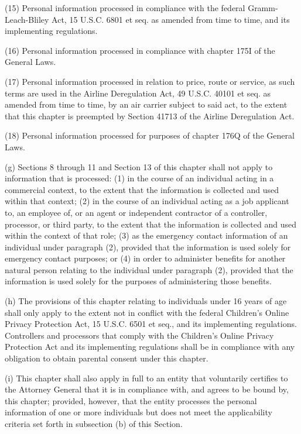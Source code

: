 (15) Personal information processed in compliance with the federal Gramm-Leach-Bliley Act, 15 U.S.C. 6801 et seq. as amended from time to time, and its implementing regulations. 

(16) Personal information processed in compliance with chapter 175I of the General Laws.  

(17) Personal information processed in relation to price, route or service, as such terms are used in the Airline Deregulation Act, 49 U.S.C. 40101 et seq. as amended from time to time, by an air carrier subject to said act, to the extent that this chapter is preempted by Section 41713 of the Airline Deregulation Act.

(18) Personal information processed for purposes of chapter 176Q of the General Laws.

(g) Sections 8 through 11 and Section 13 of this chapter shall not apply to information that is processed: (1) in the course of an individual acting in a commercial context, to the extent that the information is collected and used within that context; (2) in the course of an individual acting as a job applicant to, an employee of, or an agent or independent contractor of a controller, processor, or third party, to the extent that the information is collected and used within the context of that role; (3) as the emergency contact information of an individual under paragraph (2), provided that the information is used solely for emergency contact purposes; or (4) in order to administer benefits for another natural person relating to the individual under paragraph (2), provided that the information is used solely for the purposes of administering those benefits.

(h) The provisions of this chapter relating to individuals under 16 years of age shall only apply to the extent not in conflict with the federal Children's Online Privacy Protection Act, 15 U.S.C. 6501 et seq., and its implementing regulations. Controllers and processors that comply with the Children's Online Privacy Protection Act and its implementing regulations shall be in compliance with any obligation to obtain parental consent under this chapter.

(i) This chapter shall also apply in full to an entity that voluntarily certifies to the Attorney General that it is in compliance with, and agrees to be bound by, this chapter; provided, however, that the entity processes the personal information of one or more individuals but does not meet the applicability criteria set forth in subsection (b) of this Section.

